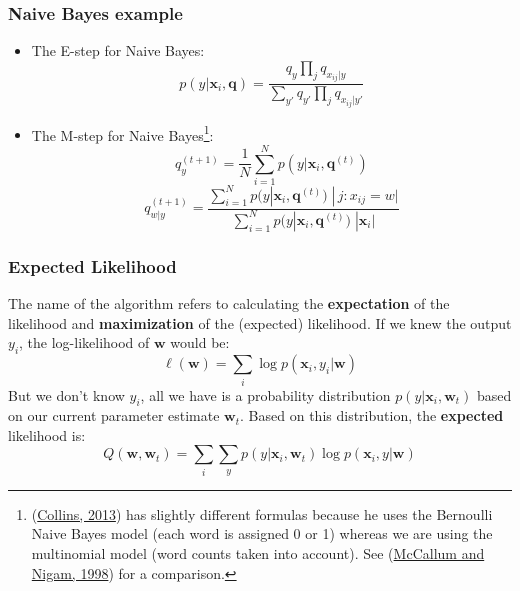 \documentclass[ignorenonframetext,plain,fleqn]{beamer}
\renewcommand{\vec}{\mathbf}
\begin{document}
\begin{frame}\frametitle{Naive Bayes example}
\begin{itemize}
\item The E-step for Naive Bayes: \[
p(y|\vec{x}_i, \vec{q}) = 
\frac{q_y \prod_j q_{x_{ij}|y}}
{\sum_{y'} q_{y'} \prod_j q_{x_{ij}|y'}}
\]
\item The M-step for Naive Bayes\footnote{
(\href{http://www.cs.columbia.edu/~mcollins/em.pdf}{Collins, 2013})
  has slightly different formulas because he uses the Bernoulli Naive
  Bayes model (each word is assigned 0 or 1) whereas we are using the
  multinomial model (word counts taken into account).  See
  (\href{http://citeseerx.ist.psu.edu/viewdoc/download?doi=10.1.1.65.9324&rep=rep1&type=pdf}{McCallum
  and Nigam, 1998}) for a comparison.
}:
\[
q_y^{(t+1)} = \frac{1}{N} \sum_{i=1}^N p(y|\vec{x}_i, \vec{q}^{(t)})
\]
\[
q_{w|y}^{(t+1)} = 
\frac{\sum_{i=1}^N p(y|\vec{x}_i, \vec{q}^{(t)})\; |\,j:x_{ij}=w|}
{\sum_{i=1}^N p(y|\vec{x}_i, \vec{q}^{(t)})\; |\vec{x}_i|}
\]
\end{itemize}
\end{frame}

\begin{frame}\frametitle{Expected Likelihood}
The name of the algorithm refers to calculating the {\bf
  expectation} of the likelihood and {\bf maximization} of the
  (expected) likelihood.  If we knew the output $y_i$, the
  log-likelihood of $\vec{w}$ would be:
\[ \ell(\vec{w}) = \sum_i \log p(\vec{x}_i, y_i|\vec{w}) \]
But we don't know $y_i$, all we have is a probability distribution
$p(y|\vec{x}_i,\vec{w}_t)$ based on our current parameter estimate
$\vec{w}_t$.  Based on this distribution, the {\bf expected}
likelihood is:
\[ Q(\vec{w},\vec{w}_t) = \sum_i \sum_y p(y|\vec{x}_i,\vec{w}_t) \log p(\vec{x}_i, y | \vec{w}) \]
\end{frame}
\end{document}
